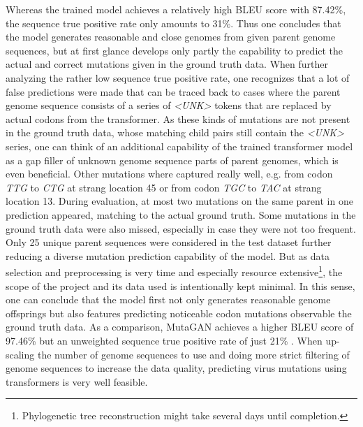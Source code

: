 Whereas the trained model achieves a relatively high \ac{BLEU} score with 87.42\%, the sequence true positive rate only amounts to 31\%. Thus one concludes that the model generates reasonable and close genomes from given parent genome sequences, but at first glance develops only partly the ca\-pa\-bi\-li\-ty to predict the actual and correct mutations given in the ground truth data. When further analyzing the rather low sequence true positive rate, one recognizes that a lot of false predictions were made that can be traced back to cases where the parent genome sequence consists of a series of \textit{<UNK>} tokens that are replaced by actual codons from the transformer. As these kinds of mutations are not present in the ground truth data, whose matching child pairs still contain the \textit{<UNK>} series, one can think of an additional capability of the trained transformer model as a gap filler of unknown genome sequence parts of parent genomes, which is even beneficial. Other mutations where captured really well, e.g. from codon \textit{TTG} to \textit{CTG} at strang location 45 or from codon \textit{TGC} to \textit{TAC} at strang location 13. During evaluation, at most two mutations on the same parent in one prediction appeared, matching to the actual ground truth. Some mutations in the ground truth data were also missed, especially in case they were not too frequent. Only 25 unique parent sequences were considered in the test dataset further reducing a diverse mutation prediction capability of the model. But as data selection and preprocessing is very time and especially resource extensive\footnote{Phylogenetic tree reconstruction might take several days until completion.}, the scope of the project and its data used is intentionally kept minimal. In this sense, one can conclude that the model first not only generates reasonable genome offsprings but also features predicting noticeable codon mutations observable the ground truth data. As a comparison, MutaGAN achieves a higher \ac{BLEU} score of 97.46\% but an unweighted sequence true positive rate of just 21\% \cite{Berman2020}. When up-scaling the number of genome sequences to use and doing more strict filtering of genome sequences to increase the data quality, predicting virus mutations using transformers is very well feasible. 

\newpage
